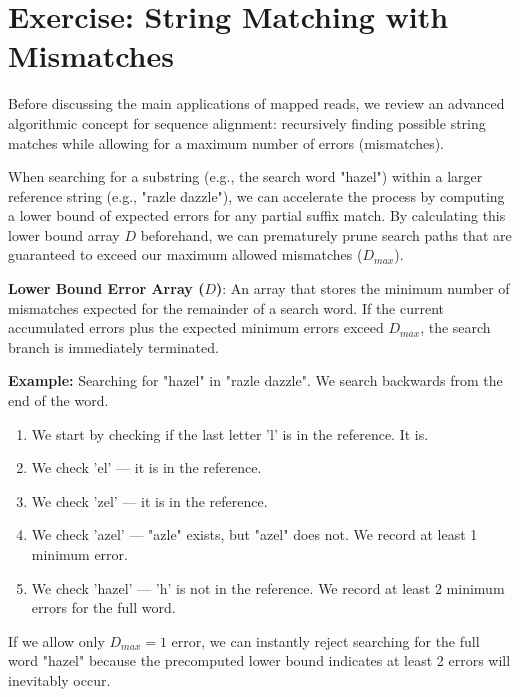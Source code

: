 \documentclass[11pt,a4paper]{article}
\newenvironment{important}{
    \vspace{1em}
    \begin{tcolorbox}[colback=blue!5!white, colframe=blue!75!black, boxrule=1pt, arc=4pt, left=10pt, right=10pt, top=10pt, bottom=10pt]
}{
    \end{tcolorbox}
    \vspace{1em}
}
\begin{document}

\section{Exercise: String Matching with Mismatches}
Before discussing the main applications of mapped reads, we review an advanced algorithmic concept for sequence alignment: recursively finding possible string matches while allowing for a maximum number of errors (mismatches). 

When searching for a substring (e.g., the search word "hazel") within a larger reference string (e.g., "razle dazzle"), we can accelerate the process by computing a lower bound of expected errors for any partial suffix match. By calculating this lower bound array \( D \) beforehand, we can prematurely prune search paths that are guaranteed to exceed our maximum allowed mismatches (\( D_{max} \)).

\begin{important}
  \textbf{Lower Bound Error Array (\( D \))}: An array that stores the minimum number of mismatches expected for the remainder of a search word. If the current accumulated errors plus the expected minimum errors exceed \( D_{max} \), the search branch is immediately terminated.
\end{important}

\textbf{Example:} Searching for "hazel" in "razle dazzle".
We search backwards from the end of the word. 
\begin{enumerate}
    \item We start by checking if the last letter 'l' is in the reference. It is. 
    \item We check 'el' — it is in the reference.
    \item We check 'zel' — it is in the reference.
    \item We check 'azel' — "azle" exists, but "azel" does not. We record at least 1 minimum error.
    \item We check 'hazel' — 'h' is not in the reference. We record at least 2 minimum errors for the full word.
\end{enumerate}

If we allow only \( D_{max} = 1 \) error, we can instantly reject searching for the full word "hazel" because the precomputed lower bound indicates at least 2 errors will inevitably occur.
\end{document}

